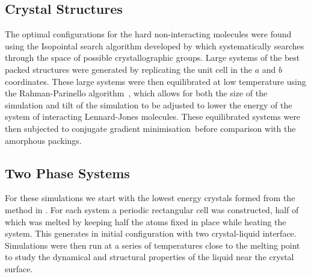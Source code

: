 \subsection{Crystal Structures}
\label{sec:method crys struc}

The optimal configurations for the hard non-interacting molecules were found using the Isopointal search algorithm developed by \textcite{hudson:10} which systematically searches through the space of possible crystallographic groups. Large systems of the best packed structures were generated by replicating the unit cell in the $a$ and $b$ coordinates. These large systems were then equilibrated at low temperature using the Rahman-Parinello algorithm~\tocite, which allows for both the size of the simulation and tilt of the simulation to be adjusted to lower the energy of the system of interacting Lennard-Jones molecules. These equilibrated systems were then subjected to conjugate gradient minimisation~\tocite before comparison with the amorphous packings.

\subsection{Two Phase Systems}

For these simulations we start with the lowest energy crystals formed from the method in . For each system a periodic rectangular cell was constructed, half of which was melted by keeping half the atoms fixed in place while heating the system. This generates in initial configuration with two crystal-liquid interface. Simulations were then run at a series of temperatures close to the melting point to study the dynamical and structural properties of the liquid near the crystal surface.
